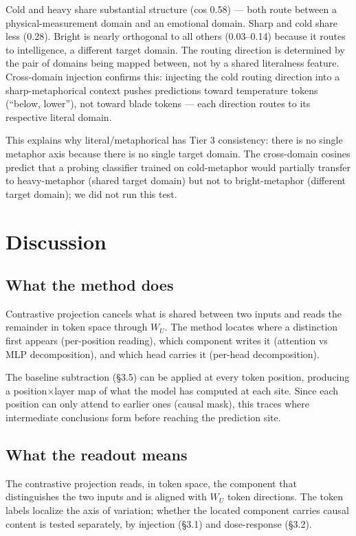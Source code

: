 \documentclass[11pt]{article}
\newcommand{\WU}{W_U}
\begin{document}
Cold and heavy share substantial structure (cos 0.58) --- both route between
a physical-measurement domain and an emotional domain. Sharp and cold share
less (0.28). Bright is nearly orthogonal to all others (0.03--0.14) because
it routes to intelligence, a different target domain. The routing direction
is determined by the pair of domains being mapped between, not by a
shared literalness feature. Cross-domain injection confirms this: injecting
the cold routing direction into a sharp-metaphorical context pushes
predictions toward temperature tokens (``below, lower''), not toward blade
tokens --- each direction routes to its respective literal domain.

This explains why literal/metaphorical has Tier 3 consistency: there is no
single metaphor axis because there is no single target domain. The
cross-domain cosines predict that a probing classifier trained on
cold-metaphor would partially transfer to heavy-metaphor (shared
target domain) but not to bright-metaphor (different target domain);
we did not run this test.

\section{Discussion}

\subsection{What the method does}

Contrastive projection cancels what is shared between two inputs and
reads the remainder in token space through $\WU$. The method locates
where a distinction first appears (per-position reading), which component
writes it (attention vs MLP decomposition), and which head carries it
(per-head decomposition).

The baseline subtraction (\S3.5) can be applied at every token
position, producing a position$\times$layer map of what the model has
computed at each site. Since each position can only attend to earlier
ones (causal mask), this traces where intermediate conclusions form
before reaching the prediction site.

\subsection{What the readout means}

The contrastive projection reads, in token space, the component that
distinguishes the two inputs and is aligned with $\WU$ token directions.
The token labels localize the axis of variation; whether the located
component carries causal content is tested separately, by injection
(\S3.1) and dose-response (\S3.2).
\end{document}
